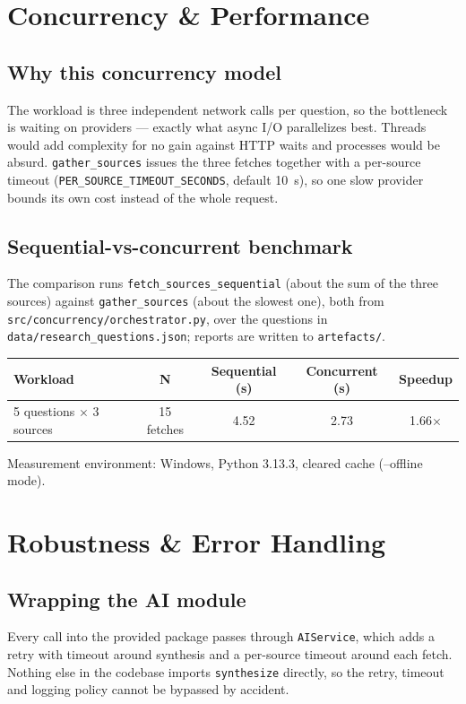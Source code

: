 \documentclass[11pt,a4paper]{article}
\newcommand{\code}[1]{\texttt{\small #1}}
\begin{document}
\section{Concurrency \& Performance}

\subsection{Why this concurrency model}
The workload is three independent network calls per question, so the bottleneck
is waiting on providers --- exactly what async I/O parallelizes best. Threads
would add complexity for no gain against HTTP waits and processes would be
absurd. \code{gather\_sources} issues the three fetches together with a
per-source timeout (\code{PER\_SOURCE\_TIMEOUT\_SECONDS}, default 10~s), so one
slow provider bounds its own cost instead of the whole request.

\subsection{Sequential-vs-concurrent benchmark}
\label{sec:bench}
The comparison runs \code{fetch\_sources\_sequential} (about the sum of the three
sources) against \code{gather\_sources} (about the slowest one), both from
\code{src/concurrency/orchestrator.py}, over the questions in
\code{data/research\_questions.json}; reports are written to \code{artefacts/}.

\begin{center}
\begin{tabular}{@{}lcccc@{}}
\toprule
\textbf{Workload} & \textbf{N} & \textbf{Sequential (s)} & \textbf{Concurrent (s)} & \textbf{Speedup} \\
\midrule
5 questions $\times$ 3 sources & 15 fetches & 4.52 & 2.73 & 1.66$\times$ \\
\bottomrule
\end{tabular}
\end{center}

\noindent Measurement environment: Windows, Python 3.13.3, cleared cache (--offline mode).

\section{Robustness \& Error Handling}

\subsection{Wrapping the AI module}
Every call into the provided package passes through \code{AIService}, which adds
a retry with timeout around synthesis and a per-source timeout around each
fetch. Nothing else in the codebase imports \code{synthesize} directly, so the
retry, timeout and logging policy cannot be bypassed by accident.
\end{document}
